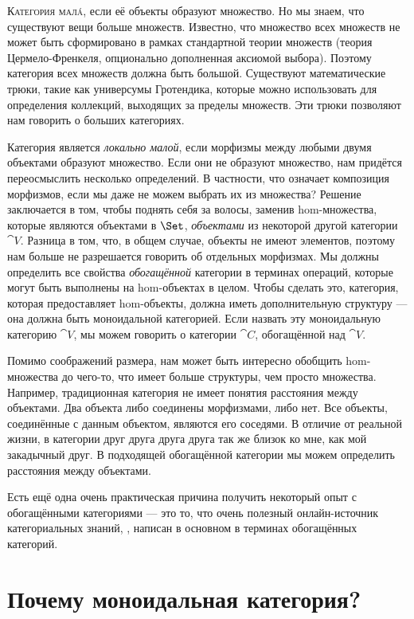 
\lettrine[lhang=0.17]{К}{атегория малá}, если её объекты образуют множество. Но мы знаем, что
существуют вещи больше множеств. Известно, что множество всех множеств не может быть
сформировано в рамках стандартной теории множеств (теория Цермело-Френкеля,
опционально дополненная аксиомой выбора). Поэтому категория всех
множеств должна быть большой. Существуют математические трюки, такие как универсумы Гротендика,
которые можно использовать для определения коллекций, выходящих за пределы множеств.
Эти трюки позволяют нам говорить о больших категориях.

Категория является \emph{локально малой}, если морфизмы между любыми двумя объектами
образуют множество. Если они не образуют множество, нам придётся переосмыслить несколько
определений. В частности, что означает композиция морфизмов, если мы
даже не можем выбрать их из множества? Решение заключается в том, чтобы поднять себя за волосы,
заменив hom-множества, которые являются объектами в $\Set$,
\emph{объектами} из некоторой другой категории $\cat{V}$. Разница в том,
что, в общем случае, объекты не имеют элементов, поэтому нам больше не
разрешается говорить об отдельных морфизмах. Мы должны определить все
свойства \emph{обогащённой} категории в терминах операций, которые
могут быть выполнены на hom-объектах в целом. Чтобы сделать это,
категория, которая предоставляет hom-объекты, должна иметь дополнительную структуру --- она
должна быть моноидальной категорией. Если назвать эту моноидальную категорию $\cat{V}$,
мы можем говорить о категории $\cat{C}$, обогащённой над $\cat{V}$.

Помимо соображений размера, нам может быть интересно обобщить hom-множества до
чего-то, что имеет больше структуры, чем просто множества. Например,
традиционная категория не имеет понятия расстояния между
объектами. Два объекта либо соединены морфизмами, либо нет. Все
объекты, соединённые с данным объектом, являются его соседями. В отличие
от реальной жизни, в категории друг друга друга друга так же
близок ко мне, как мой закадычный друг. В подходящей обогащённой категории мы можем
определить расстояния между объектами.

Есть ещё одна очень практическая причина получить некоторый опыт с
обогащёнными категориями — это то, что очень полезный онлайн-источник
категориальных знаний, , написан
в основном в терминах обогащённых категорий.

\section{Почему моноидальная категория?}


